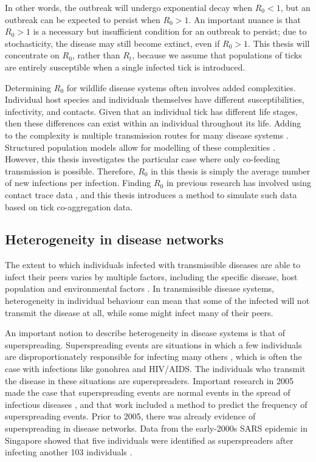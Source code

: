 \documentclass{article}
\begin{document}
In other words, the outbreak will undergo exponential decay when $ R_0 < 1 $, but an outbreak can be expected to persist when $ R_0 > 1 $. An important nuance is that $ R_0 > 1 $ is a necessary but insufficient condition for an outbreak to persist; due to stochasticity, the disease may still become extinct, even if $ R_0 > 1 $. This thesis will concentrate on $ R_0 $, rather than $ R_t $, because we assume that populations of ticks are entirely susceptible when a single infected tick is introduced.

Determining $ R_0 $ for wildlife disease systems often involves added complexities. Individual host species and individuals themselves have different susceptibilities, infectivity, and contacts. Given that an individual tick has different life stages, then these differences can exist within an individual throughout its life. Adding to the complexity is multiple transmission routes for many disease systems \cite{Hartemink2008}. Structured population models allow for modelling of these complexities \cite{Diekman2000}. However, this thesis investigates the particular case where only co-feeding transmission is possible. Therefore, $ R_0 $ in this thesis is simply the average number of new infections per infection. Finding $ R_0 $ in previous research has involved using contact trace data \cite{LloydSmith2005}, and this thesis introduces a method to simulate such data based on tick co-aggregation data.

\subsection{Heterogeneity in disease networks}

The extent to which individuals infected with transmissible diseases are able to infect their peers varies by multiple factors, including the specific disease, host population and environmental factors \cite{LloydSmith2005}. In transmissible disease systems, heterogeneity in individual behaviour can mean that some of the infected will not transmit the disease at all, while some might infect many of their peers.

An important notion to describe heterogeneity in disease systems is that of superspreading. Superspreading events are situations in which a few individuals are disproportionately responsible for infecting many others \cite{Galvani_2005}, which is often the case with infections like gonohrea and HIV/AIDS. The individuals who transmit the disease in these situations are superspreaders. Important research in 2005 made the case that superspreading events are normal events in the spread of infectious diseases \cite{LloydSmith2005}, and that work included a method to predict the frequency of superspreading events. Prior to 2005, there was already evidence of superspreading in disease networks. Data from the early-2000s SARS epidemic in Singapore showed that five individuals were identified as superspreaders after infecting another 103 individuals \cite{CDC2003}.
\end{document}
